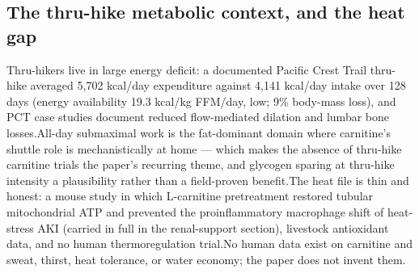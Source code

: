 \documentclass[11pt]{article}
\newcommand{\src}[1]{\allowbreak[#1]}
\begin{document}
\subsection{The thru-hike metabolic context, and the heat gap}

Thru-hikers live in large energy deficit: a documented Pacific Crest Trail thru-hike averaged 5{,}702 kcal/day expenditure against 4{,}141 kcal/day intake over 128 days (energy availability 19.3 kcal/kg FFM/day, low; 9\% body-mass loss), and PCT case studies document reduced flow-mediated dilation and lumbar bone losses.\src{155}\src{156}\src{157} All-day submaximal work is the fat-dominant domain where carnitine's shuttle role is mechanistically at home --- which makes the absence of thru-hike carnitine trials the paper's recurring theme, and glycogen sparing at thru-hike intensity a plausibility rather than a field-proven benefit.\src{154}\src{135} The heat file is thin and honest: a mouse study in which L-carnitine pretreatment restored tubular mitochondrial ATP and prevented the proinflammatory macrophage shift of heat-stress AKI (carried in full in the renal-support section), livestock antioxidant data, and no human thermoregulation trial.\src{158}\src{159} No human data exist on carnitine and sweat, thirst, heat tolerance, or water economy; the paper does not invent them.\src{128}
\end{document}
